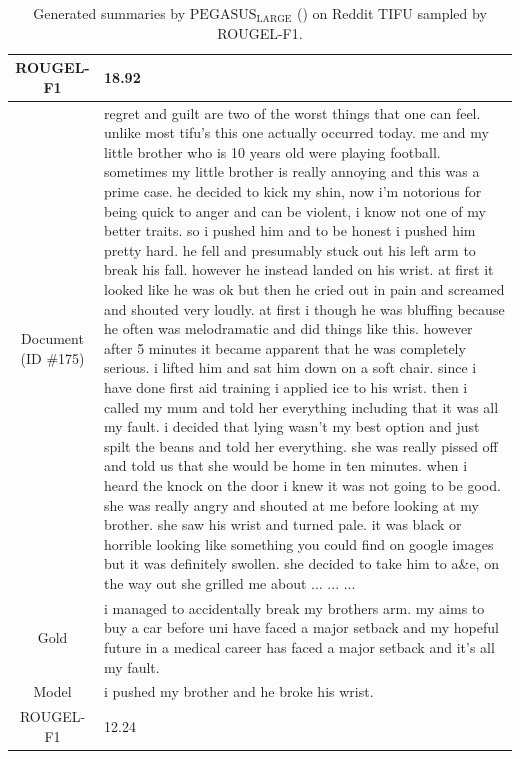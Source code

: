 \begin{table}[bth!]
\begin{tabular}{c|p{}}
ROUGEL-F1 & 
18.92
\\ \hline
\makecell{Document\\(ID \#175)} & 
regret and guilt are two of the worst things that one can feel. unlike most tifu's this one actually occurred today. me and my little brother who is 10 years old were playing football. sometimes my little brother is really annoying and this was a prime case. he decided to kick my shin, now i'm notorious for being quick to anger and can be violent, i know not one of my better traits. so i pushed him and to be honest i pushed him pretty hard. he fell and presumably stuck out his left arm to break his fall. however he instead landed on his wrist. at first it looked like he was ok but then he cried out in pain and screamed and shouted very loudly. at first i though he was bluffing because he often was melodramatic and did things like this. however after 5 minutes it became apparent that he was completely serious. i lifted him and sat him down on a soft chair. since i have done first aid training i applied ice to his wrist. then i called my mum and told her everything including that it was all my fault. i decided that lying wasn't my best option and just spilt the beans and told her everything. she was really pissed off and told us that she would be home in ten minutes. when i heard the knock on the door i knew it was not going to be good. she was really angry and shouted at me before looking at my brother. she saw his wrist and turned pale. it was black or horrible looking like something you could find on google images but it was definitely swollen. she decided to take him to a\&e, on the way out she grilled me about ... ... ... 
\\ \hline
Gold & 
i managed to accidentally break my brothers arm. my aims to buy a car before uni have faced a major setback and my hopeful future in a medical career has faced a major setback and it's all my fault.
\\ \hline
Model & 
i pushed my brother and he broke his wrist.
\\ \hline
ROUGEL-F1 & 
12.24
\\ \hline
\end{tabular}
\caption{Generated summaries by $\text{PEGASUS}_{\text{LARGE}}$ (\gnews) on Reddit TIFU sampled by ROUGEL-F1.}
\end{table}
